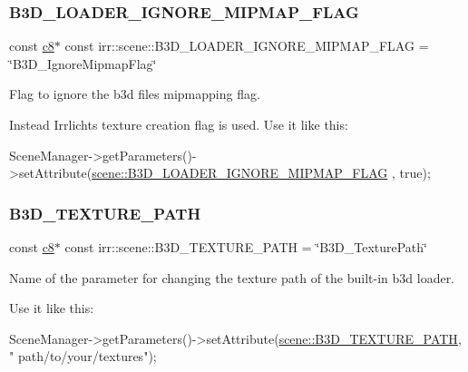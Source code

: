 \subsubsection{\texorpdfstring{B3\+D\+\_\+\+L\+O\+A\+D\+E\+R\+\_\+\+I\+G\+N\+O\+R\+E\+\_\+\+M\+I\+P\+M\+A\+P\+\_\+\+F\+L\+AG}{B3D\_LOADER\_IGNORE\_MIPMAP\_FLAG}}
{\footnotesize\ttfamily const \hyperlink{namespaceirr_a9395eaea339bcb546b319e9c96bf7410}{c8}$\ast$ const irr\+::scene\+::\+B3\+D\+\_\+\+L\+O\+A\+D\+E\+R\+\_\+\+I\+G\+N\+O\+R\+E\+\_\+\+M\+I\+P\+M\+A\+P\+\_\+\+F\+L\+AG = \char`\"{}B3\+D\+\_\+\+Ignore\+Mipmap\+Flag\char`\"{}}



Flag to ignore the b3d file\textquotesingle{}s mipmapping flag. 

Instead Irrlicht\textquotesingle{}s texture creation flag is used. Use it like this\+: 
\begin{DoxyCode}
SceneManager->getParameters()->setAttribute(\hyperlink{namespaceirr_1_1scene_a0a190773ebdbed9f134b17d496fc526a}{scene::B3D\_LOADER\_IGNORE\_MIPMAP\_FLAG}
      , \textcolor{keyword}{true});
\end{DoxyCode}
 \mbox{\label{namespaceirr_1_1scene_acaad1f28c235751815637948cc845c15}} 
\subsubsection{\texorpdfstring{B3\+D\+\_\+\+T\+E\+X\+T\+U\+R\+E\+\_\+\+P\+A\+TH}{B3D\_TEXTURE\_PATH}}
{\footnotesize\ttfamily const \hyperlink{namespaceirr_a9395eaea339bcb546b319e9c96bf7410}{c8}$\ast$ const irr\+::scene\+::\+B3\+D\+\_\+\+T\+E\+X\+T\+U\+R\+E\+\_\+\+P\+A\+TH = \char`\"{}B3\+D\+\_\+\+Texture\+Path\char`\"{}}



Name of the parameter for changing the texture path of the built-\/in b3d loader. 

Use it like this\+: 
\begin{DoxyCode}
SceneManager->getParameters()->setAttribute(\hyperlink{namespaceirr_1_1scene_acaad1f28c235751815637948cc845c15}{scene::B3D\_TEXTURE\_PATH}, \textcolor{stringliteral}{"
      path/to/your/textures"});
\end{DoxyCode}
 \mbox{\label{namespaceirr_1_1scene_a157681b3ef101a801ce278e6f21de946}} 
